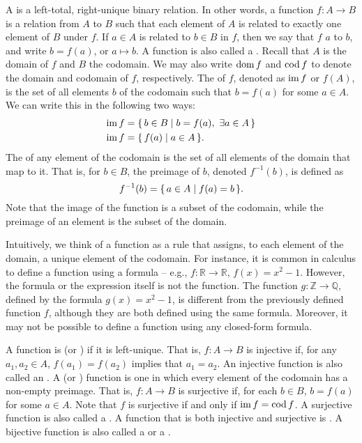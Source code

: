 A  is a left-total, right-unique binary relation. In other words, a function $f \colon A \to B$ is a relation from $A$ to $B$ such that each element of $A$ is related to exactly one element of $B$ under $f$. If $a \in A$ is related to $b \in B$ in $f$, then we say that $f$  $a$ to $b$, and write $b = f(a)$, or $a \mapsto b$. A function is also called a . Recall that $A$ is the domain of $f$ and $B$ the codomain. We may also write $\operatorname{dom} f$ and $\operatorname{cod} f$ to denote the domain and codomain of $f$, respectively. The  of $f$, denoted as $\operatorname{im} f$ or $f(A)$, is the set of all elements $b$ of the codomain such that $b = f(a)$ for some $a \in A$. We can write this in the following two ways:
\begin{align*}
\operatorname{im} f & = \qty{\, b \in B \mid b = f(a),~ \exists a \in A \,} \\
\operatorname{im} f & = \qty{\, f(a) \mid a \in A \,}.
\end{align*}
The  of any element of the codomain is the set of all elements of the domain that map to it. That is, for $b \in B$, the preimage of $b$, denoted $f^{-1}(b)$, is defined as
\begin{equation*}
f^{-1}(b) = \qty{\, a \in A \mid f(a) = b \,}.
\end{equation*}
Note that the image of the function is a subset of the codomain, while the preimage of an element is the subset of the domain.

\begin{Note*}
Intuitively, we think of a function as a rule that assigns, to each element of the domain, a unique element of the codomain. For instance, it is common in calculus to define a function using a formula -- e.g., $f \colon \mathbb R \to \mathbb R$, $f(x) = x^2 - 1$. However, the formula or the expression itself is not the function. The function $g \colon \mathbb Z \to \mathbb Q$, defined by the formula $g(x) = x^2 - 1$, is different from the previously defined function $f$, although they are both defined using the same formula. Moreover, it may not be possible to define a function using any closed-form formula.
\end{Note*}

A function is  (or ) if it is left-unique. That is, $f \colon A \to B$ is injective if, for any $a_1, a_2 \in A$, $f(a_1) = f(a_2)$ implies that $a_1 = a_2$. An injective function is also called an . A  (or ) function is one in which every element of the codomain has a non-empty preimage. That is, $f \colon A \to B$ is surjective if, for each $b \in B$, $b = f(a)$ for some $a \in A$. Note that $f$ is surjective if and only if $\operatorname{im} f = \operatorname{cod} f$. A surjective function is also called a . A function that is both injective and surjective is . A bijective function is also called a  or a .


